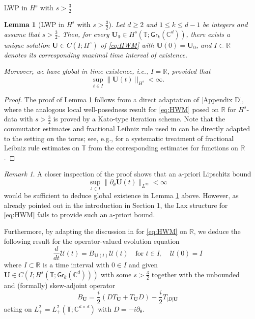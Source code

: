 \documentclass[10pt,reqno,a4paper]{amsart}
\makeatletter
\newtheorem{lem}{Lemma}[section]
\theoremstyle{definition}
\theoremstyle{remark}
\theoremstyle{remark}
\newtheorem*{remark*}{Remark}
\numberwithin{equation}{section}
\newcommand{\C}{\mathbb{C}}
\newcommand{\R}{\mathbb{R}}
\newcommand{\T}{\mathbb{T}}
\newcommand{\pt}{\partial}
\newcommand{\be}{\begin{equation}}
\newcommand{\ee}{\end{equation}}
\newcommand{\Ub}{\mathbf{U}}
\newcommand{\id}{I}
\newcommand{\Gr}{\mathsf{Gr}}
\newcommand{\Us}{\mathscr{U}}
\def\section{\@startsection{section}{1}%
  \z@{1.5\linespacing\@plus\linespacing}{.5\linespacing}%
  {\normalfont\bfseries\large\centering}}
\makeatother
\begin{document}
\begin{appendix}

\section{LWP in $H^s$ with $s > \frac 3 2$} 

\label{app:lwp}

\begin{lem}[LWP in $H^s$ with $s > \frac 3 2$] \label{lem:lwp}
Let $d \geq 2$ and $1 \leq k \leq d-1$ be integers and assume that $s > \frac{3}{2}$. Then, for every $\Ub_0 \in H^s(\T; \Gr_k(\C^d))$, there exists a unique solution $\Ub \in C(I; H^s)$ of \eqref{eq:HWM} with $\Ub(0)= \Ub_0$, and $I \subset \R$ denotes its corresponding maximal time interval of existence. 

Moreover, we have global-in-time existence, i.e., $I = \R$, provided that 
$$
\sup_{t \in I} \| \Ub(t) \|_{H^s} < \infty.
$$
\end{lem}

\begin{proof}
The proof of Lemma \ref{lem:lwp} follows from a direct adaptation of  \cite{GeLe-25}[Appendix D], where the analogous local well-posedness result for \eqref{eq:HWM} posed on $\R$ for $H^s$-data with $s > \frac 3 2$ is proved by a Kato-type iteration scheme. Note that the commutator estimates and fractional Leibniz rule used in \cite{GeLe-25} can be directly adapted to the setting on the torus; see, e.g., \cite{BeOhTe-25} for a systematic treatment of fractional Leibniz rule estimates on $\T$ from the corresponding estimates for functions on $\R$. 
\end{proof}

\begin{remark*}
A closer inspection of the proof shows that an a-priori Lipschitz bound 
$$
\sup_{t \in I} \| \pt_\theta \Ub(t) \|_{L^\infty} < \infty
$$
would be sufficient to deduce global existence in Lemma \ref{lem:lwp} above. However, as already pointed out in the introduction in Section 1, the Lax structure for \eqref{eq:HWM} fails to provide such an a-priori bound. 
\end{remark*}

Furthermore, by adapting the discussion in \cite{GeLe-25} for \eqref{eq:HWM} on $\R$, we deduce the following result for the operator-valued evolution equation
\be \label{eq:ode}
\frac{d}{dt} \Us(t) = B_{\Ub(t)} \Us(t) \quad \mbox{for $t \in I$}, \quad \Us(0) = \id
\ee
where $I \subset \R$ is a time interval with $0 \in I$ and given $\Ub \in C(I; H^s(\T; \Gr_k(\C^d)))$ with some $s > \frac{3}{2}$ together with the unbounded and (formally) skew-adjoint operator
$$
B_{\Ub} = \frac{i}{2} ( D  T_{\Ub} + T_{\Ub}  D ) - \frac{i}{2} T_{|D| \Ub}
$$
acting on $L^2_+ = L^2_+(\T; \C^{d \times d})$ with $D = -i \pt_\theta$.


\end{appendix}
\end{document}
